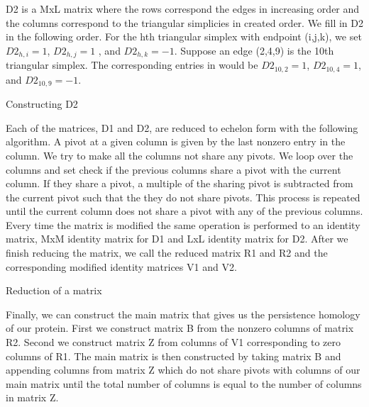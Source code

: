 \documentclass[12pt, a4paper, twocolumn, fullpage]{article}
\theoremstyle{plain}
\theoremstyle{definition}
\theoremstyle{remark}
\begin{document}
D2 is a MxL matrix where the rows correspond the edges in increasing order and the columns correspond to the triangular simplicies in created order. We fill in D2 in the following order. For the hth triangular simplex with endpoint (i,j,k), we set $D2_{h,i} = 1$, $D2_{h,j} = 1$ , and $D2_{h,k} = -1$. Suppose an edge (2,4,9) is the 10th triangular simplex. The corresponding entries in would be $D2_{10,2}=1$, $D2_{10,4}=1$, and $D2_{10,9}=-1$. 

\begin{algorithm}
\caption{Constructing D2}
\begin{algorithmic}
\ENDFOR
\end{algorithmic}
\end{algorithm}

Each of the matrices, D1 and D2, are reduced to echelon form with the following algorithm. A pivot at a given column is given by the last nonzero entry in the column. We try to make all the columns not share any pivots. We loop over the columns and set check if the previous columns share a pivot with the current column. If they share a pivot, a multiple of the sharing pivot is subtracted from the current pivot such that the they do not share pivots. This process is repeated until the current column does not share a pivot with any of the previous columns. Every time the matrix is modified the same operation is performed to an identity matrix, MxM identity matrix for D1 and LxL identity matrix for D2. After we finish reducing the matrix, we call the reduced matrix R1 and R2 and the corresponding modified identity matrices V1 and V2.

\begin{algorithm}
\caption{Reduction of a matrix}
\begin{algorithmic}
        \ENDIF
    \ENDFOR 
\ENDFOR
\end{algorithmic}
\end{algorithm}

Finally, we can construct the main matrix that gives us the persistence homology of our protein. First we construct matrix B from the nonzero columns of matrix R2.  Second we construct matrix Z from columns of V1 corresponding to zero columns of R1. The main matrix is then constructed by taking matrix B and appending columns from matrix Z which do not share pivots with columns of our main matrix until the total number of columns is equal to the number of columns in matrix Z.
\end{document}
